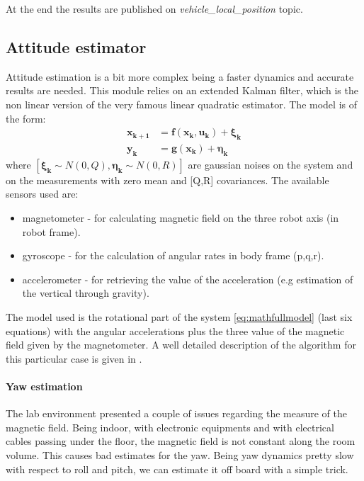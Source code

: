 \noindent
At the end the results are  published on \textit{vehicle\_local\_position} topic.

\subsection{Attitude estimator}

Attitude estimation is a bit more complex being a faster dynamics and accurate results are needed. This module relies on an extended Kalman filter, which is the non linear version of the very famous linear quadratic estimator. The model is of the form:
\begin{equation}
	\begin{aligned}
	\boldsymbol{x_{k+1}}& = \boldsymbol{f(\boldsymbol{x_k}, \boldsymbol{u_k})} + \boldsymbol{\xi_k} \\
	\boldsymbol{y_k}& = \boldsymbol{ g(\boldsymbol{x_k}) } + \boldsymbol{\eta_k}
	\end{aligned}
\end{equation}
where $[\boldsymbol{\xi_k} \sim N(0,Q), \boldsymbol{\eta_k} \sim N(0,R) ]$ are gaussian noises on the system and on the measurements with zero mean and [Q,R] covariances. The available sensors used are: \begin{itemize}
	\item magnetometer - for calculating magnetic field on the three robot axis (in robot frame).
	\item gyroscope - for the calculation of angular rates in body frame (p,q,r).
	\item accelerometer - for retrieving the value of the acceleration (e.g estimation of the vertical through gravity).
	\end{itemize}

\noindent
The model used is the rotational part of the system \eqref{eq:mathfullmodel} (last six equations) with the angular accelerations plus the three value of the magnetic field given by the magnetometer. A well detailed description of the algorithm for this particular case is given in \cite{attekf}.

\noindent
\paragraph{Yaw estimation} The lab environment presented a couple of issues regarding the measure of the magnetic field. Being indoor, with electronic equipments and with electrical cables passing under the floor, the magnetic field is not constant along the room volume. This causes bad estimates for the yaw. Being yaw dynamics pretty slow with respect to roll and pitch, we can estimate it off board with a simple trick.\\

